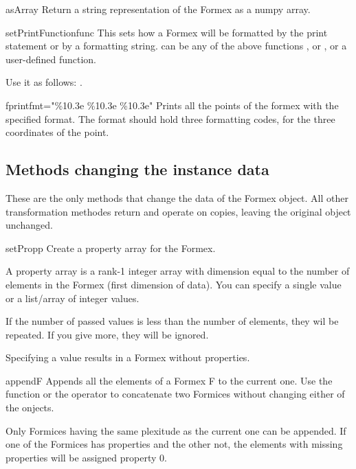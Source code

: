 {{\begin{methoddesc}{asArray}{}
Return a string representation of the Formex as a numpy array.
\end{methoddesc}

\begin{methoddesc}{setPrintFunction}{func}
This sets how a Formex will be formatted by the print statement or by a  formatting string.  can be any of the above functions ,  or , or a user-defined function. 

\classmethod
Use it as follows: .
\end{methoddesc}


\begin{methoddesc}{fprint}{fmt="\%10.3e \%10.3e \%10.3e"}
Prints all the points of the formex with the specified format. The format should hold three formatting codes, for the three coordinates of the point. 
\end{methoddesc}


\subsection{Methods changing the instance data}
These are the only methods that change the data of the Formex object. All other transformation methodes return and operate on copies, leaving the original object unchanged.

\begin{methoddesc}{setProp}{p}
Create a property array for the Formex.

A property array is a rank-1 integer array with dimension equal to the number of elements in the Formex (first dimension of data). You can specify a single value or a list/array of integer values.

If the number of passed values is less than the number of elements, they wil be repeated. If you give more, they will be ignored. 

Specifying a value  results in a Formex without properties.
\end{methoddesc}

\begin{methoddesc}{append}{F}
Appends all the elements of a Formex F to the current one. Use the  function or the \Code{+} operator to concatenate two Formices without changing either of the onjects.

Only Formices having the same plexitude as the current one can be appended.
If one of the Formices has properties and the other not, the elements with missing properties will be assigned property 0.
\end{methoddesc}


}}
